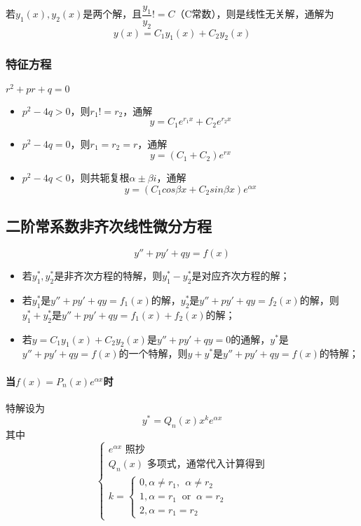若\(y_1(x),y_2(x)\)是两个解，且\(\dfrac{y_1}{y_2} != C\)（C常数），则是线性无关解，通解为\[y(x) = C_1y_1(x) + C_2y_2(x)\]

\subsubsection{特征方程}
\(r^2 + pr + q = 0\)
\begin{itemize}
    \item \(p^2 - 4q > 0\)，则\(r_1 != r_2\)，通解\[y = C_1e^{r_1x} + C_2e^{r_2x}\]
    \item \(p^2 - 4q = 0\)，则\(r_1 = r_2 = r\)，通解\[y = (C_1 + C_2)e^{rx}\]
    \item \(p^2 - 4q < 0\)，则共轭复根\(\alpha \pm \beta i\)，通解\[y = (C_1cos\beta x + C_2sin\beta x)e^{\alpha x}\]
\end{itemize}


\subsection{二阶常系数非齐次线性微分方程}
\[y'' + py' + qy = f(x)\]
\begin{itemize}
    \item 若\(y_1^*, y_2^*\)是非齐次方程的特解，则\(y_1^* - y_2^*\)是对应齐次方程的解；

    \item 若\(y_1^*\)是\(y'' + py' + qy = f_1(x)\)的解，\(y_2^*\)是\(y'' + py' + qy = f_2(x)\)的解，则\(y_1^* + y_2^*\)是\(y'' + py' + qy = f_1(x) + f_2(x)\)的解；

    \item 若\(y = C_1y_1(x) + C_2y_2(x)\)是\(y'' + py' + qy = 0\)的通解，\(y^*\)是\(y'' + py' + qy = f(x)\)的一个特解，则\(y + y^*\)是\(y'' + py' + qy = f(x)\)的特解；
\end{itemize}

\paragraph{当\(f(x) = P_n(x)e^{\alpha x}\)时}
特解设为
\[y^* = Q_n(x)x^ke^{\alpha x}\]其中
\[\begin{cases}
    e^{\alpha x}\text{ 照抄} \\
    Q_n(x)\text{ 多项式，通常代入计算得到} \\
    k = \begin{cases}
        0, \alpha \neq r_1,\ \ \alpha \neq r_2 \\ 
        1, \alpha = r_1\ \text{ or }\ \alpha = r_2 \\ 
        2, \alpha = r_1 = r_2
    \end{cases}
\end{cases}\]

